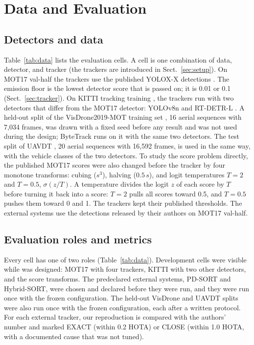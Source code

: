 \section{Data and Evaluation}\label{sec:data-eval}

\subsection{Detectors and data}\label{sec:data}
Table~\ref{tab:data} lists the evaluation cells. A cell is one combination of
data, detector, and tracker (the trackers are introduced in
Sect.~\ref{sec:setup}). On MOT17 val-half \cite{milan2016mot16} the trackers
use the published YOLOX-X detections \cite{ge2021yolox}. The emission floor is
the lowest detector score that is passed on; it is 0.01 or 0.1
(Sect.~\ref{sec:tracker}). On KITTI tracking training \cite{geiger2012kitti},
the trackers run with two detectors that differ from the MOT17 detector:
YOLOv8n \cite{jocher2023yolov8} and RT-DETR-L \cite{zhao2024rtdetr}. A held-out
split of the VisDrone2019-MOT training set \cite{zhu2022visdrone}, 16 aerial
sequences with 7,034 frames, was drawn with a fixed seed before any result
and was not used during the design; ByteTrack runs on it with the same two
detectors. The test split of UAVDT \cite{du2018uavdt}, 20 aerial sequences
with 16,592 frames, is used in the same way, with the vehicle classes of the
two detectors. To study
the score problem directly, the published MOT17 scores were also changed
before the tracker by four monotone transforms: cubing ($s^3$), halving ($0.5\,s$),
and logit temperatures $T=2$ and $T=0.5$, $\sigma(z/T)$. A temperature
divides the logit $z$ of each score by $T$ before turning it back into a
score: $T=2$ pulls all scores toward 0.5, and $T=0.5$ pushes them toward 0
and 1. The trackers kept their published thresholds. The external systems use the detections released
by their authors on MOT17 val-half.



\subsection{Evaluation roles and metrics}\label{sec:roles}
Every cell has one of two roles (Table~\ref{tab:data}). Development cells
were visible while \scl{} was designed: MOT17 with four trackers, KITTI with
two other detectors, and the score transforms. The predeclared external systems,
PD-SORT and Hybrid-SORT, were chosen and declared before they were run, and
they were run once with the frozen configuration. The held-out VisDrone and
UAVDT splits were also run once with the frozen configuration, each after a
written protocol.
For each external tracker,
our reproduction is compared with the authors' number and marked EXACT
(within 0.2 HOTA) or CLOSE (within 1.0 HOTA, with a documented cause that was
not tuned).

